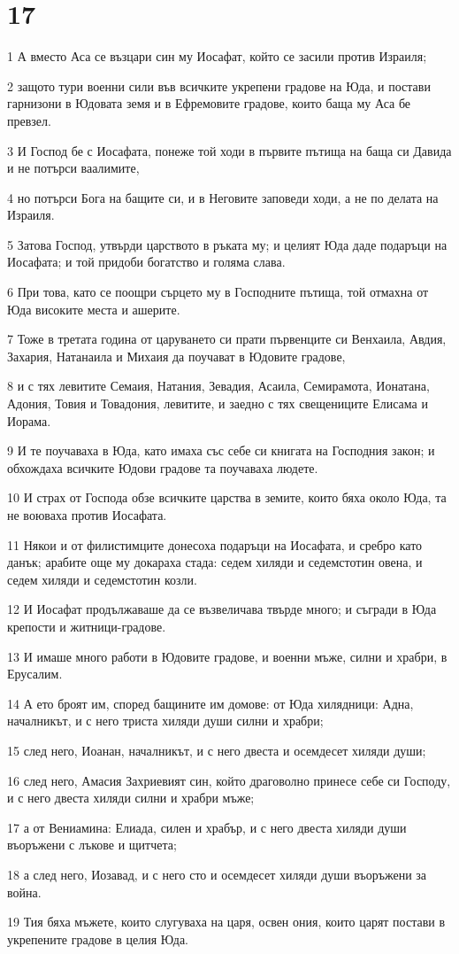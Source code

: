 \chapter{17}

\par 1 А вместо Аса се възцари син му Иосафат, който се засили против Израиля;
\par 2 защото тури военни сили във всичките укрепени градове на Юда, и постави гарнизони в Юдовата земя и в Ефремовите градове, които баща му Аса бе превзел.
\par 3 И Господ бе с Иосафата, понеже той ходи в първите пътища на баща си Давида и не потърси ваалимите,
\par 4 но потърси Бога на бащите си, и в Неговите заповеди ходи, а не по делата на Израиля.
\par 5 Затова Господ, утвърди царството в ръката му; и целият Юда даде подаръци на Иосафата; и той придоби богатство и голяма слава.
\par 6 При това, като се поощри сърцето му в Господните пътища, той отмахна от Юда високите места и ашерите.
\par 7 Тоже в третата година от царуването си прати първенците си Венхаила, Авдия, Захария, Натанаила и Михаия да поучават в Юдовите градове,
\par 8 и с тях левитите Семаия, Натания, Зевадия, Асаила, Семирамота, Ионатана, Адония, Товия и Товадония, левитите, и заедно с тях свещениците Елисама и Иорама.
\par 9 И те поучаваха в Юда, като имаха със себе си книгата на Господния закон; и обхождаха всичките Юдови градове та поучаваха людете.
\par 10 И страх от Господа обзе всичките царства в земите, които бяха около Юда, та не воюваха против Иосафата.
\par 11 Някои и от филистимците донесоха подаръци на Иосафата, и сребро като данък; арабите още му докараха стада: седем хиляди и седемстотин овена, и седем хиляди и седемстотин козли.
\par 12 И Иосафат продължаваше да се възвеличава твърде много; и съгради в Юда крепости и житници-градове.
\par 13 И имаше много работи в Юдовите градове, и военни мъже, силни и храбри, в Ерусалим.
\par 14 А ето броят им, според бащините им домове: от Юда хилядници: Адна, началникът, и с него триста хиляди души силни и храбри;
\par 15 след него, Иоанан, началникът, и с него двеста и осемдесет хиляди души;
\par 16 след него, Амасия Захриевият син, който драговолно принесе себе си Господу, и с него двеста хиляди силни и храбри мъже;
\par 17 а от Вениамина: Елиада, силен и храбър, и с него двеста хиляди души въоръжени с лъкове и щитчета;
\par 18 а след него, Иозавад, и с него сто и осемдесет хиляди души въоръжени за война.
\par 19 Тия бяха мъжете, които слугуваха на царя, освен ония, които царят постави в укрепените градове в целия Юда.

